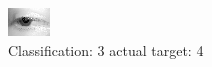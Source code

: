 \begin{figure}[h!]
\begin{center}
\includegraphics[width=0.60\columnwidth]{figures/ID2646_class_3_target_4.png}
\end{center}
\caption{ Classification: 3 actual target: 4}
\label{fig:ID2646_class_3_target_4}
\end{figure}
